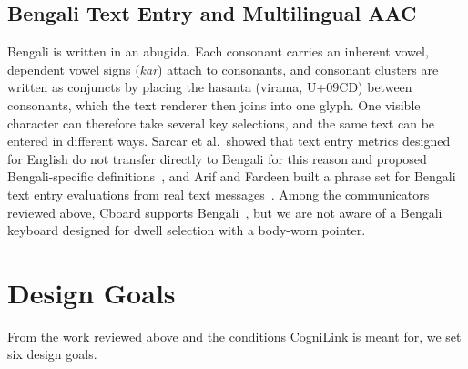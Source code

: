 \documentclass[journal]{IEEEtran}
\begin{document}
\subsection{Bengali Text Entry and Multilingual AAC}
Bengali is written in an abugida. Each consonant carries an inherent vowel, dependent vowel signs (\textit{kar}) attach to consonants, and consonant clusters are written as conjuncts by placing the hasanta (virama, U+09CD) between consonants, which the text renderer then joins into one glyph. One visible character can therefore take several key selections, and the same text can be entered in different ways. Sarcar et al.\ showed that text entry metrics designed for English do not transfer directly to Bengali for this reason and proposed Bengali-specific definitions~\cite{sarcar2015}, and Arif and Fardeen built a phrase set for Bengali text entry evaluations from real text messages~\cite{arif2016}. Among the communicators reviewed above, Cboard supports Bengali~\cite{cboard}, but we are not aware of a Bengali keyboard designed for dwell selection with a body-worn pointer.

\section{Design Goals}
\label{sec:goals}

From the work reviewed above and the conditions CogniLink is meant for, we set six design goals.
\end{document}
